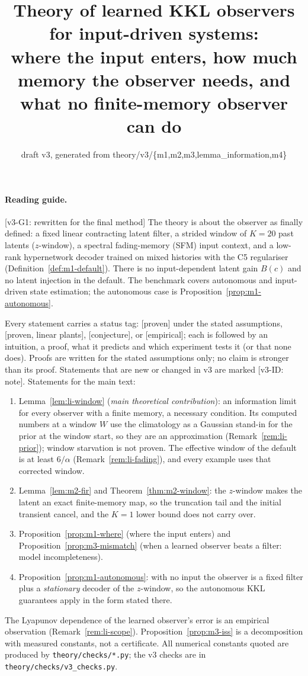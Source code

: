 \documentclass[11pt]{article}
\title{Theory of learned KKL observers for input-driven systems:\\ where the input enters, how much memory the
observer needs, and what no finite-memory observer can do}
\date{draft v3, generated from theory/v3/\{m1,m2,m3,lemma\_information,m4\}}
\theoremstyle{definition}
\newcommand{\vthree}[2]{{\color{blue!55!black}\textsf{\footnotesize[v3-#1: #2]}}}
\begin{document}
\maketitle
\paragraph{Reading guide.} \vthree{G1}{rewritten for the final method} The theory is about the observer as finally
defined: a fixed linear contracting latent filter, a strided window of $K=20$ past latents ($z$-window), a spectral
fading-memory (SFM) input context, and a low-rank hypernetwork decoder trained on mixed histories with the C5
regulariser (Definition~\ref{def:m1-default}). There is no input-dependent latent gain $B(c)$ and no latent injection in
the default. The benchmark covers autonomous and input-driven state estimation; the autonomous case is
Proposition~\ref{prop:m1-autonomous}.

Every statement carries a status tag: [proven] under the stated assumptions, [proven, linear plants], [conjecture], or
[empirical]; each is followed by an intuition, a proof, what it predicts and which experiment tests it (or that none
does). Proofs are written for the stated assumptions only; no claim is stronger than its proof. Statements that are new
or changed in v3 are marked \vthree{ID}{note}. Statements for the main text:
\begin{enumerate}[leftmargin=*,itemsep=1pt]
\item Lemma~\ref{lem:li-window} (\emph{main theoretical contribution}): an information limit for every observer with a
finite memory, a necessary condition. Its computed numbers at a window $W$ use the climatology as a Gaussian stand-in
for the prior at the window start, so they are an approximation (Remark~\ref{rem:li-prior}); window starvation is not
proven. The effective window of the default is at least $6/\alpha$ (Remark~\ref{rem:li-fading}), and every example uses
that corrected window.
\item Lemma~\ref{lem:m2-fir} and Theorem~\ref{thm:m2-window}: the $z$-window makes the latent an exact finite-memory map,
so the truncation tail and the initial transient cancel, and the $K=1$ lower bound does not carry over.
\item Proposition~\ref{prop:m1-where} (where the input enters) and Proposition~\ref{prop:m3-mismatch} (when a learned
observer beats a filter: model incompleteness).
\item Proposition~\ref{prop:m1-autonomous}: with no input the observer is a fixed filter plus a \emph{stationary} decoder
of the $z$-window, so the autonomous KKL guarantees apply in the form stated there.
\end{enumerate}
The Lyapunov dependence of the learned observer's error is an empirical observation (Remark~\ref{rem:li-scope}).
Proposition~\ref{prop:m3-iss} is a decomposition with measured constants, not a certificate. All numerical constants
quoted are produced by \texttt{theory/checks/*.py}; the v3 checks are in \texttt{theory/checks/v3\_checks.py}.




\appendix




\end{document}
